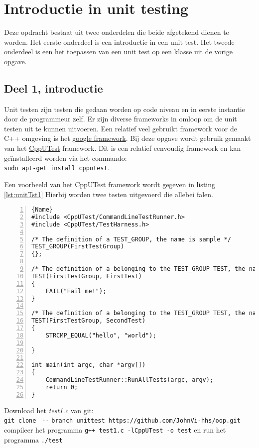 \chapter{Introductie in unit testing}

Deze opdracht bestaat uit twee onderdelen die beide afgetekend dienen te worden.
Het eerste onderdeel is een introductie in een unit test. Het tweede onderdeel is een het toepassen van een unit test op een klasse uit de vorige opgave.

\section{Deel 1, introductie}

Unit testen zijn testen die gedaan worden op code niveau en in eerste instantie door de programmeur zelf. 
Er zijn diverse frameworks in omloop om de unit testen uit te kunnen uitvoeren.
Een relatief veel gebruikt framework voor de C++ omgeving is het \href {https://github.com/google/googletest}{google framework}.         
Bij deze opgave wordt gebruik gemaakt van het \href{https://cpputest.github.io/} {CppUTest} framework. 
Dit is een relatief eenvoudig framework en kan geïnstalleerd worden via het commando:\\
\texttt{sudo apt-get install cpputest}.

Een voorbeeld van het CppUTest framework wordt gegeven in listing \ref{lst:unitTst1} Hierbij worden twee testen uitgevoerd die allebei falen.
\begin{lstlisting}[caption= Een eenvoudige unittest. ,frame=trbl,firstnumber=1,numbers=left,label={lst:unitTst1}]{Name}
#include <CppUTest/CommandLineTestRunner.h>
#include <CppUTest/TestHarness.h>

/* The definition of a TEST_GROUP, the name is sample */
TEST_GROUP(FirstTestGroup)
{};

/* The definition of a belonging to the TEST_GROUP TEST, the name is ret_int_success */
TEST(FirstTestGroup, FirstTest)
{
	FAIL("Fail me!");
}

/* The definition of a belonging to the TEST_GROUP TEST, the name is ret_int_failed */
TEST(FirstTestGroup, SecondTest)
{
	STRCMP_EQUAL("hello", "world");
	
}

int main(int argc, char *argv[])
{
	CommandLineTestRunner::RunAllTests(argc, argv);
	return 0;
}
\end{lstlisting}
Download het \textit{test1.c}  van git:\\
{\small \texttt{git clone } \verb|--| \texttt{branch unittest https://github.com/JohnVi-hhs/oop.git}}\\
compileer het programma \texttt{g++ test1.c -lCppUTest -o test} en 
run het programma   \texttt{./test}

